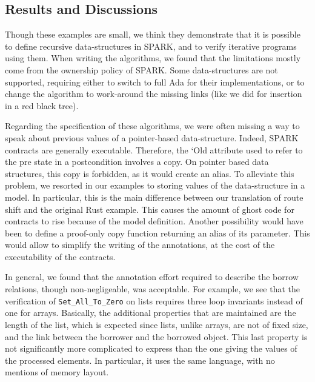 \documentclass[runningheads]{llncs}
\begin{document}
\subsection{Results and Discussions}
Though these examples are small, we think they demonstrate that it is possible to define recursive data-structures in SPARK, and to verify iterative programs using them. When writing the algorithms, we found that the limitations mostly come from the ownership policy of SPARK. Some data-structures are not supported, requiring either to switch to full Ada for their implementations, or to change the algorithm to work-around the missing links (like we did for insertion in a red black tree).

Regarding the specification of these algorithms, we were often missing a way to speak about previous values of a pointer-based data-structure. Indeed, SPARK contracts are generally executable. Therefore, the ‘Old attribute used to refer to the pre state in a postcondition involves a copy. On pointer based data structures, this copy is forbidden, as it would create an alias. To alleviate this problem, we resorted in our examples to storing values of the data-structure in a model. In particular, this is the main difference between our translation of route shift and the original Rust example. This causes the amount of ghost code for contracts to rise because of the model definition. Another possibility would have been to define a proof-only copy function returning an alias of its parameter. This would allow to simplify the writing of the annotations, at the cost of the executability of the contracts.

In general, we found that the annotation effort required to describe the borrow relations, though non-negligeable, was acceptable. For example, we see that the verification of \texttt{Set\_All\_To\_Zero} on lists requires three loop invariants instead of one for arrays. Basically, the additional properties that are maintained are the length of the list, which is expected since lists, unlike arrays, are not of fixed size, and the link between the borrower and the borrowed object. This last property is not significantly more complicated to express than the one giving the values of the processed elements. In particular, it uses the same language, with no mentions of memory layout.
\end{document}
